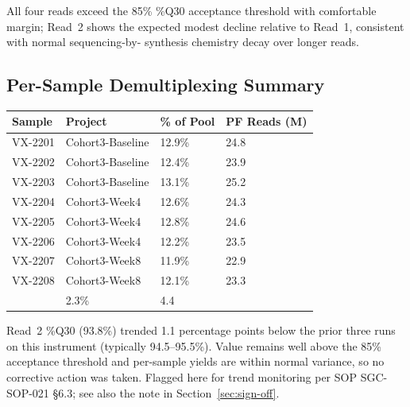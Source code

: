 \begin{center}
\end{center}

All four reads exceed the 85\% \%Q30 acceptance threshold with comfortable margin; Read~2
shows the expected modest decline relative to Read~1, consistent with normal sequencing-by-
synthesis chemistry decay over longer reads.

\subsection{Per-Sample Demultiplexing Summary}

\begin{tabularx}{\linewidth}{@{} l X C{2.0cm} C{2.0cm} @{}}
\toprule
{}
{\color{white}\bfseries Sample} & {\color{white}\bfseries Project} & {\color{white}\bfseries \% of Pool} & {\color{white}\bfseries PF Reads (M)} \\
\midrule
VX-2201 & Cohort3-Baseline & 12.9\% & 24.8 \\
VX-2202 & Cohort3-Baseline & 12.4\% & 23.9 \\
VX-2203 & Cohort3-Baseline & 13.1\% & 25.2 \\
VX-2204 & Cohort3-Week4    & 12.6\% & 24.3 \\
VX-2205 & Cohort3-Week4    & 12.8\% & 24.6 \\
VX-2206 & Cohort3-Week4    & 12.2\% & 23.5 \\
VX-2207 & Cohort3-Week8    & 11.9\% & 22.9 \\
VX-2208 & Cohort3-Week8    & 12.1\% & 23.3 \\
\midrule
{}
 & 2.3\% & 4.4 \\
\bottomrule
\end{tabularx}

\begin{warnbox}
Read~2 \%Q30 (93.8\%) trended 1.1 percentage points below the prior three runs on this
instrument (typically 94.5--95.5\%). Value remains well above the 85\% acceptance threshold
and per-sample yields are within normal variance, so no corrective action was taken. Flagged
here for trend monitoring per SOP SGC-SOP-021 \S6.3; see also the note in
Section~\ref{sec:sign-off}.
\end{warnbox}
